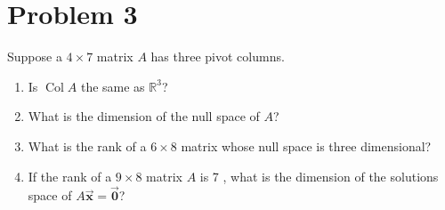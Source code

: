 \documentclass[letter,11pt]{article}
\begin{document}
\section{Problem 3}
Suppose a $4 \times 7$ matrix $A$ has three pivot columns.
\begin{enumerate}[label = \roman*.]
    \item Is $\operatorname{Col} A$ the same as $\mathbb{R}^{3}$?
    \item What is the dimension of the null space of $A$?
    \item What is the rank of a $6 \times 8$ matrix whose null space is three dimensional?
    \item If the rank of a $9 \times 8$ matrix $A$ is 7 , what is the dimension of the solutions space of $A \vec{\mathrm{\boldsymbol{x}}}=\vec{\boldsymbol{0}}$?
\end{enumerate}
\end{document}
